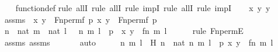 \begin{isabellebody}
%
\isadelimproof
\ \ %
\endisadelimproof
%
\isatagproof
{}\isamarkupfalse%
\ function{\isacharunderscore}{\kern0pt}def\isanewline
{}\isamarkupfalse%
{\isacharparenleft}{\kern0pt}rule\ allI{\isacharcomma}{\kern0pt}\ rule\ allI{\isacharcomma}{\kern0pt}\ rule\ impI{\isacharcomma}{\kern0pt}\ rule\ allI{\isacharcomma}{\kern0pt}\ rule\ impI{\isacharparenright}{\kern0pt}\isanewline
\ \ \isamarkupfalse%
\ x\ y\ y{\isacharprime}{\kern0pt}\ \isanewline
\ \ \isamarkupfalse%
\ assms{}\ {\isacharcolon}{\kern0pt}\ {\isachardoublequoteopen}{\isacharless}{\kern0pt}x{\isacharcomma}{\kern0pt}\ y{\isachargreater}{\kern0pt}\ {\isasymin}\ Fn{\isacharunderscore}{\kern0pt}perm{\isacharparenleft}{\kern0pt}f{\isacharcomma}{\kern0pt}\ p{\isacharparenright}{\kern0pt}{\isachardoublequoteclose}\ {\isachardoublequoteopen}{\isacharless}{\kern0pt}x{\isacharcomma}{\kern0pt}\ y{\isacharprime}{\kern0pt}{\isachargreater}{\kern0pt}\ {\isasymin}\ Fn{\isacharunderscore}{\kern0pt}perm{\isacharparenleft}{\kern0pt}f{\isacharcomma}{\kern0pt}\ p{\isacharparenright}{\kern0pt}{\isachardoublequoteclose}\isanewline
\ \ \isamarkupfalse%
\ {\isachardoublequoteopen}{\isasymexists}n\ {\isasymin}\ nat{\isachardot}{\kern0pt}\ {\isasymexists}m\ {\isasymin}\ nat{\isachardot}{\kern0pt}\ {\isasymexists}l\ {\isasymin}\ {}{\isachardot}{\kern0pt}\ {\isacharless}{\kern0pt}{\isacharless}{\kern0pt}n{\isacharcomma}{\kern0pt}\ m{\isachargreater}{\kern0pt}{\isacharcomma}{\kern0pt}\ l{\isachargreater}{\kern0pt}\ {\isasymin}\ p\ {\isasymand}\ {\isacharless}{\kern0pt}x{\isacharcomma}{\kern0pt}\ y{\isachargreater}{\kern0pt}\ {\isacharequal}{\kern0pt}\ {\isacharless}{\kern0pt}{\isacharless}{\kern0pt}f{\isacharbackquote}{\kern0pt}n{\isacharcomma}{\kern0pt}\ m{\isachargreater}{\kern0pt}{\isacharcomma}{\kern0pt}\ l{\isachargreater}{\kern0pt}{\isachardoublequoteclose}\ \isanewline
\ \ \ \ \isamarkupfalse%
{\isacharparenleft}{\kern0pt}rule\ Fn{\isacharunderscore}{\kern0pt}permE{\isacharparenright}{\kern0pt}\isanewline
\ \ \ \ \isamarkupfalse%
\ assms\ assms{}\ \isanewline
\ \ \ \ \isamarkupfalse%
\ auto\isanewline
\ \ \isamarkupfalse%
\ \isamarkupfalse%
\ n\ m\ l\ \ H{\isacharcolon}{\kern0pt}\ {\isachardoublequoteopen}n\ {\isasymin}\ nat{\isachardoublequoteclose}\ {\isachardoublequoteopen}{\isacharless}{\kern0pt}{\isacharless}{\kern0pt}n{\isacharcomma}{\kern0pt}\ m{\isachargreater}{\kern0pt}{\isacharcomma}{\kern0pt}\ l{\isachargreater}{\kern0pt}\ {\isasymin}\ p{\isachardoublequoteclose}\ {\isachardoublequoteopen}{\isacharless}{\kern0pt}x{\isacharcomma}{\kern0pt}\ y{\isachargreater}{\kern0pt}\ {\isacharequal}{\kern0pt}\ {\isacharless}{\kern0pt}{\isacharless}{\kern0pt}f{\isacharbackquote}{\kern0pt}n{\isacharcomma}{\kern0pt}\ m{\isachargreater}{\kern0pt}{\isacharcomma}{\kern0pt}\ l{\isachargreater}{\kern0pt}{\isachardoublequoteclose}\ \isamarkupfalse%

\end{isabellebody}

